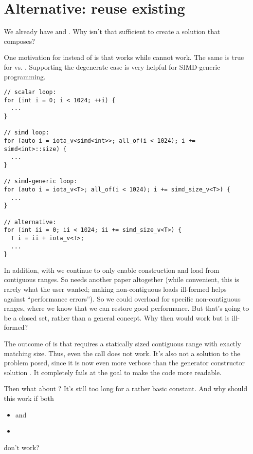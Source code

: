 \section{Alternative: reuse existing }

We already have  and .
Why isn't that sufficient to create a solution that composes?

One motivation for  instead of 
is that  works while  cannot work.
The same is true for  vs.
.
Supporting the degenerate case is very helpful for SIMD-generic programming.

\medskip\begin{lstlisting}[style=Vc]
// scalar loop:
for (int i = 0; i < 1024; ++i) {
  ...
}

// simd loop:
for (auto i = iota_v<simd<int>>; all_of(i < 1024); i += simd<int>::size) {
  ...
}

// simd-generic loop:
for (auto i = iota_v<T>; all_of(i < 1024); i += simd_size_v<T>) {
  ...
}

// alternative:
for (int ii = 0; ii < 1024; ii += simd_size_v<T>) {
  T i = ii + iota_v<T>;
  ...
}
\end{lstlisting}

In addition, with  we continue to only enable construction and
load from contiguous ranges.
So  needs another paper altogether (while
  convenient, this is rarely what the user wanted; making non-contiguous loads
ill-formed helps against “performance errors”).
So we could overload for specific non-contiguous ranges, where we know that we
can restore good performance.
But that's going to be a closed set, rather than a general concept.
Why then would  work but
 is ill-formed?

The outcome of  is that  requires a statically
sized contiguous range with exactly matching size.
Thus, even the call
 does not work.
It's also not a solution to the problem posed, since it is now even more
verbose than the generator constructor solution .
It completely fails at the goal to make the code more readable.

Then what about ?
It's still too long for a rather basic constant.
And why should this work if both
\begin{itemize}
  \item {} and
  \item {}
\end{itemize}
don't work?

